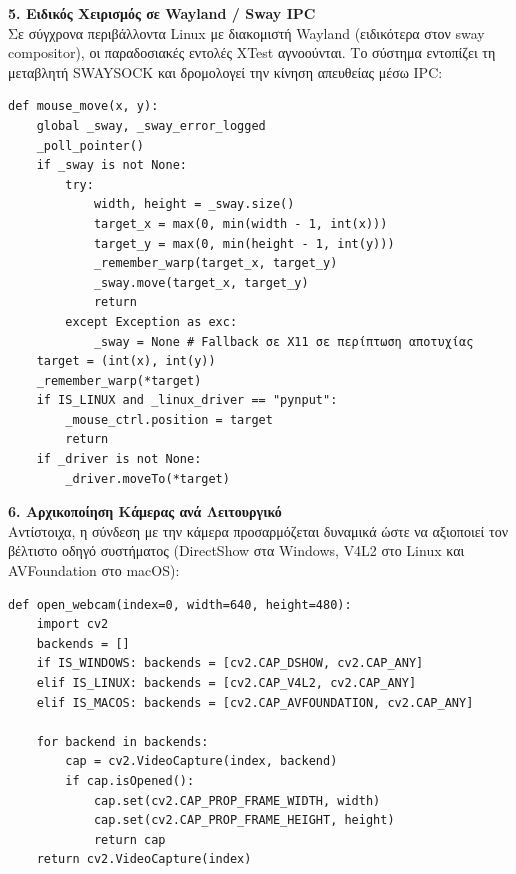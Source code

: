 \documentclass[twoside, a4paper, 11pt]{article}
\newcommand{\textlatin}[1]{\textenglish{#1}}
\begin{document}
\textbf{5. Ειδικός Χειρισμός σε Wayland / Sway IPC}\\
Σε σύγχρονα περιβάλλοντα Linux με διακομιστή Wayland (ειδικότερα στον \textlatin{sway compositor}), οι παραδοσιακές εντολές \textlatin{XTest} αγνοούνται. Το σύστημα εντοπίζει τη μεταβλητή \textlatin{SWAYSOCK} και δρομολογεί την κίνηση απευθείας μέσω IPC:

\begin{verbatim}
def mouse_move(x, y):
    global _sway, _sway_error_logged
    _poll_pointer()
    if _sway is not None:
        try:
            width, height = _sway.size()
            target_x = max(0, min(width - 1, int(x)))
            target_y = max(0, min(height - 1, int(y)))
            _remember_warp(target_x, target_y)
            _sway.move(target_x, target_y)
            return
        except Exception as exc:
            _sway = None # Fallback σε X11 σε περίπτωση αποτυχίας
    target = (int(x), int(y))
    _remember_warp(*target)
    if IS_LINUX and _linux_driver == "pynput":
        _mouse_ctrl.position = target
        return
    if _driver is not None:
        _driver.moveTo(*target)
\end{verbatim}

\textbf{6. Αρχικοποίηση Κάμερας ανά Λειτουργικό}\\
Αντίστοιχα, η σύνδεση με την κάμερα προσαρμόζεται δυναμικά ώστε να αξιοποιεί τον βέλτιστο οδηγό συστήματος (\textlatin{DirectShow} στα Windows, \textlatin{V4L2} στο Linux και \textlatin{AVFoundation} στο macOS):

\begin{verbatim}
def open_webcam(index=0, width=640, height=480):
    import cv2
    backends = []
    if IS_WINDOWS: backends = [cv2.CAP_DSHOW, cv2.CAP_ANY]
    elif IS_LINUX: backends = [cv2.CAP_V4L2, cv2.CAP_ANY]
    elif IS_MACOS: backends = [cv2.CAP_AVFOUNDATION, cv2.CAP_ANY]

    for backend in backends:
        cap = cv2.VideoCapture(index, backend)
        if cap.isOpened():
            cap.set(cv2.CAP_PROP_FRAME_WIDTH, width)
            cap.set(cv2.CAP_PROP_FRAME_HEIGHT, height)
            return cap
    return cv2.VideoCapture(index)
\end{verbatim}
\end{document}

